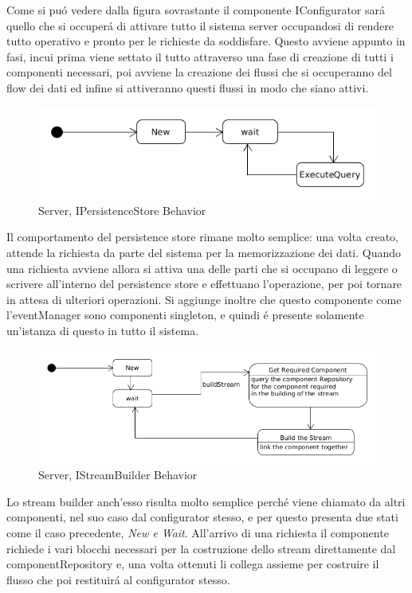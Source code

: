 Come si pu\'o vedere dalla figura sovrastante il componente IConfigurator sar\'a quello che si occuper\'a di attivare tutto il sistema server occupandosi di rendere tutto operativo e pronto per le richieste da soddisfare. Questo avviene appunto in fasi, incui prima viene settato il tutto attraverso una fase di creazione di tutti i componenti necessari, poi avviene la creazione dei flussi che si occuperanno del flow dei dati ed infine si attiveranno questi flussi in modo che siano attivi.

\begin{figure}[h]
\centering
\includegraphics[width=\textwidth]{Figures/LogicArchitecture/Server/IPersistenceStoreBehavior}
\caption{Server, IPersistenceStore Behavior}
\end{figure}

Il comportamento del persistence store rimane molto semplice: una volta creato, attende la richiesta da parte del sistema per la memorizzazione dei dati.
Quando una richiesta avviene allora si attiva una delle parti che si occupano di leggere o scrivere all'interno del persistence store e effettuano l'operazione, per poi tornare in attesa di ulteriori operazioni. Si aggiunge inoltre che questo componente come l'eventManager sono componenti singleton, e quindi \'e presente solamente un'istanza di questo in tutto il sistema.

\begin{figure}[h]
\centering
\includegraphics[width=\textwidth]{Figures/LogicArchitecture/Server/IStreamBuiderBehavior}
\caption{Server, IStreamBuilder Behavior}
\end{figure}

Lo stream builder anch'esso risulta molto semplice perch\'e viene chiamato da altri componenti, nel suo caso dal configurator stesso, e per questo presenta due stati come il caso precedente, \textit{New e Wait}. All'arrivo di una richiesta il componente richiede i vari blocchi necessari per la costruzione dello stream direttamente dal componentRepository e, una volta ottenuti li collega assieme per costruire il flusso che poi restituir\'a al configurator stesso.

